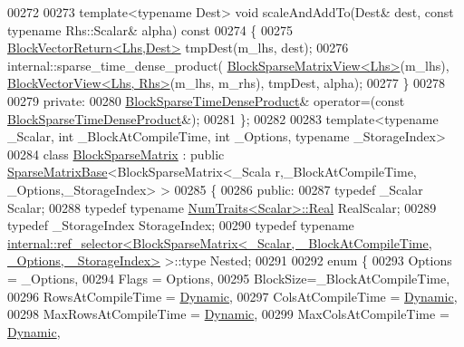 \begin{DoxyCode}
00272 
00273     \textcolor{keyword}{template}<\textcolor{keyword}{typename} Dest> \textcolor{keywordtype}{void} scaleAndAddTo(Dest& dest, \textcolor{keyword}{const} \textcolor{keyword}{typename} Rhs::Scalar& alpha)\textcolor{keyword}{ const}
00274 \textcolor{keyword}{    }\{
00275       \hyperlink{class_eigen_1_1_block_vector_return}{BlockVectorReturn<Lhs,Dest>} tmpDest(m\_lhs, dest);
00276       internal::sparse\_time\_dense\_product( \hyperlink{class_eigen_1_1_block_sparse_matrix_view}{BlockSparseMatrixView<Lhs>}(m\_lhs),  
      \hyperlink{class_eigen_1_1_block_vector_view}{BlockVectorView<Lhs, Rhs>}(m\_lhs, m\_rhs), tmpDest, alpha);
00277     \}
00278 
00279   \textcolor{keyword}{private}:
00280     \hyperlink{class_eigen_1_1_block_sparse_time_dense_product}{BlockSparseTimeDenseProduct}& operator=(\textcolor{keyword}{const} 
      \hyperlink{class_eigen_1_1_block_sparse_time_dense_product}{BlockSparseTimeDenseProduct}&);
00281 \};
00282 
00283 \textcolor{keyword}{template}<\textcolor{keyword}{typename} \_Scalar, \textcolor{keywordtype}{int} \_BlockAtCompileTime, \textcolor{keywordtype}{int} \_Options, \textcolor{keyword}{typename} \_StorageIndex>
00284 \textcolor{keyword}{class }\hyperlink{group___sparse_core___module_class_eigen_1_1_block_sparse_matrix}{BlockSparseMatrix} : \textcolor{keyword}{public} \hyperlink{group___sparse_core___module_class_eigen_1_1_sparse_matrix_base}{SparseMatrixBase}<BlockSparseMatrix<\_Scala
      r,\_BlockAtCompileTime, \_Options,\_StorageIndex> >
00285 \{
00286   \textcolor{keyword}{public}:
00287     \textcolor{keyword}{typedef} \_Scalar Scalar;
00288     \textcolor{keyword}{typedef} \textcolor{keyword}{typename} \hyperlink{group___core___module_struct_eigen_1_1_num_traits}{NumTraits<Scalar>::Real} RealScalar;
00289     \textcolor{keyword}{typedef} \_StorageIndex StorageIndex;
00290     \textcolor{keyword}{typedef} \textcolor{keyword}{typename} 
      \hyperlink{struct_eigen_1_1internal_1_1ref__selector}{internal::ref\_selector<BlockSparseMatrix<\_Scalar, \_BlockAtCompileTime, \_Options, \_StorageIndex>}
       >::type Nested;
00291 
00292     \textcolor{keyword}{enum} \{
00293       Options = \_Options,
00294       Flags = Options,
00295       BlockSize=\_BlockAtCompileTime,
00296       RowsAtCompileTime = \hyperlink{namespace_eigen_ad81fa7195215a0ce30017dfac309f0b2}{Dynamic},
00297       ColsAtCompileTime = \hyperlink{namespace_eigen_ad81fa7195215a0ce30017dfac309f0b2}{Dynamic},
00298       MaxRowsAtCompileTime = \hyperlink{namespace_eigen_ad81fa7195215a0ce30017dfac309f0b2}{Dynamic},
00299       MaxColsAtCompileTime = \hyperlink{namespace_eigen_ad81fa7195215a0ce30017dfac309f0b2}{Dynamic},

\end{DoxyCode}
